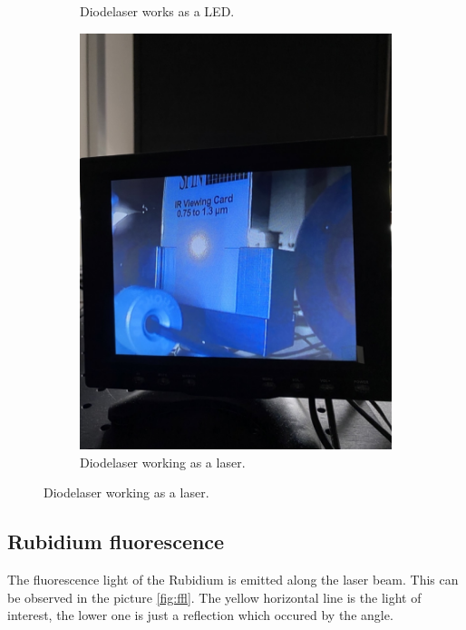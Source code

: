 \begin{figure}
\begin{subfigure}[b]{0.45\textwidth}
        \caption{Diodelaser works as a LED.}
    \end{subfigure}
    \hfill
    \begin{subfigure}[b]{0.45\textwidth}
        \centering
        \includegraphics[width=\textwidth]{beam2.jpeg}
        \caption{Diodelaser working as a laser.}
    \end{subfigure}
\end{figure}

\subsection{Rubidium fluorescence}
The fluorescence light of the Rubidium is emitted along the laser beam. This can be observed in the picture
\ref{fig:ffl}. The yellow horizontal line is the light of interest, the lower one is just a reflection
which occured by the angle.


